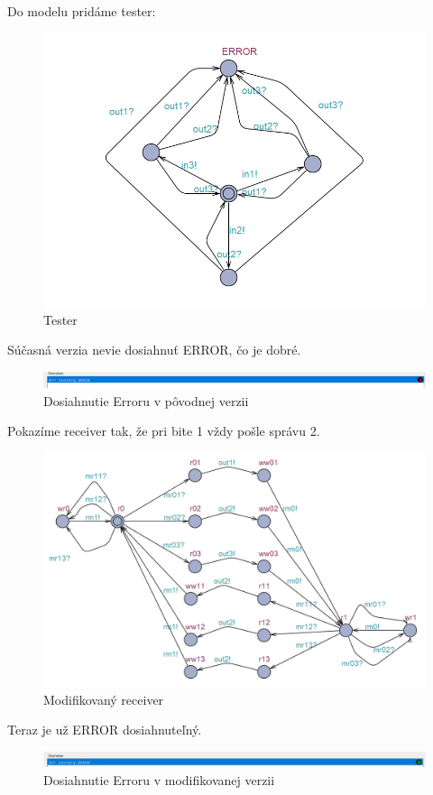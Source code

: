 \documentclass[a4paper]{article}
\begin{document}
Do modelu pridáme tester:

\begin{figure}[!h]
	\centering
	\includegraphics[width=1\textwidth]{tester.png}
	\caption{Tester}
\end{figure}

Súčasná verzia nevie dosiahnuť ERROR, čo je dobré.

\begin{figure}[!h]
	\centering
	\includegraphics[width=1\textwidth]{R10.png}
	\caption{Dosiahnutie Erroru v pôvodnej verzii}
\end{figure}
\newpage

Pokazíme receiver tak, že pri bite 1 vždy pošle správu 2.

\begin{figure}[!h]
	\centering
	\includegraphics[width=1\textwidth]{rec.png}
	\caption{Modifikovaný receiver}
\end{figure}

Teraz je už ERROR dosiahnuteľný.

\begin{figure}[!h]
	\centering
	\includegraphics[width=1\textwidth]{R11.png}
	\caption{Dosiahnutie Erroru v modifikovanej verzii}
\end{figure}
\end{document}
